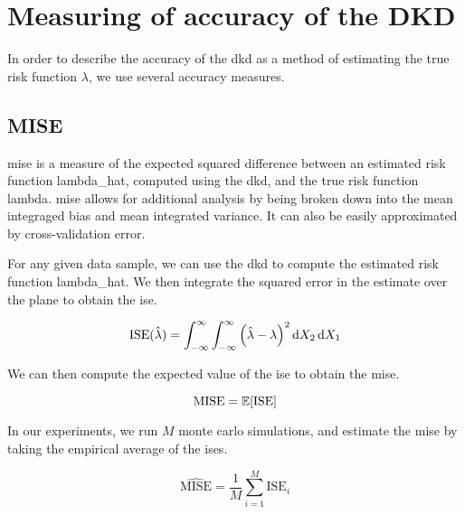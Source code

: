 \section{Measuring of accuracy of the DKD}
\label{sec:method:accuracy}

In order to describe the accuracy of the \gls{dkd} as a method of estimating the true risk function \(\lambda\),
we use several accuracy measures.

\subsection{MISE}
\label{subsec:method:mise}

\Gls{mise} is a measure of the expected squared difference between an estimated risk function \gls{lambda_hat},
computed using the \gls{dkd}, and the true risk function \gls{lambda}.
\Gls{mise} allows for additional analysis by being broken down into the mean integraged bias and mean integrated variance.
It can also be easily approximated by cross-validation error.

For any given data sample, we can use the \gls{dkd} to compute the estimated risk function \gls{lambda_hat}.
We then integrate the squared error in the estimate over the plane to obtain the \gls{ise}.

\begin{equation}
    \mbox{ISE}(\hat{\lambda}) = \int_{-\infty}^{\infty} \int_{-\infty}^{\infty} \left( \hat{\lambda} - \lambda \right)^2 \mathop{}\!\mathrm{d}{X_2} \mathop{}\!\mathrm{d}{X_1}
\end{equation}

We can then compute the expected value of the \gls{ise} to obtain the \gls{mise}.

\begin{equation}
    \mbox{MISE} = \mathbb{E} [\mbox{ISE}]
\end{equation}

In our experiments, we run \(M\) monte carlo simulations, and estimate the \gls{mise} by taking the empirical average of the \glspl{ise}.

\begin{equation}
    \hat{\mbox{MISE}} = \frac{1}{M} \sum_{i=1}^{M} \mbox{ISE}_i
\end{equation}

